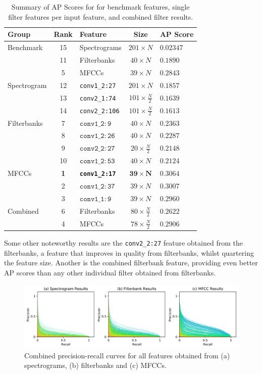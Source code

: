 \begin{table}[!ht]
    \mytable
    \caption{Summary of AP Scores for for benchmark features, single filter features per input feature, and combined filter results.}
    \begin{tabularx}{0.91\linewidth}{@{}lcLcl@{}}
        \toprule
        Group       & Rank    & Feature       & Size  & AP Score   \\ \midrule
        Benchmark   & 15 & Spectrograms  & $201 \times N$  & $0.02347$ \\
                    & 11 & Filterbanks   & $40 \times N$  & $0.1890$ \\
                    & 5 & MFCCs         & $39 \times N$  & $0.2843$ \\ \hline
        Spectrogram & 12 & \texttt{conv1\_2:27} & $201 \times N$  & $0.1857$ \\
                    & 13 & \texttt{conv2\_1:74} & $101 \times \frac{N}{2}$  & $0.1639$ \\
                    & 14 & \texttt{conv2\_2:106} & $101 \times \frac{N}{2}$ & $0.1613$ \\ \hline
        Filterbanks & 7 & $\mathtt{conv1\_2:9}$  & $40 \times N$  & $0.2363$ \\
                    & 8 & $\mathtt{conv1\_2:26}$  & $40 \times N$  & $0.2287$ \\
                    & 9 & $\mathtt{conv2\_2:27}$  & $20 \times \frac{N}{2}$  & $0.2148$ \\
                    & 10 & $\mathtt{conv1\_2:53}$  & $40 \times N$  & $0.2124$ \\ \hline
        MFCCs       & \textbf{1} & \texttt{\textbf{conv1\_2:17}}  & $\bm{39 \times N}$  & $\bm{0.3064}$ \\
                    & 2 & $\mathtt{conv1\_2:37}$  & $39 \times N$  & $0.3007$ \\
                    & 3 & $\mathtt{conv1\_1:9}$  & $39 \times N$  & $0.2960$ \\ \hline
        Combined    & 6 & Filterbanks   & $80 \times \frac{N}{2}$  & $0.2622$ \\
                    & 4 & MFCCs         & $78 \times \frac{N}{2}$  & $0.2906$ \\
        \bottomrule
    \end{tabularx}
    \label{tbl:summarised_results}
\end{table}

Some other noteworthy results are the \texttt{conv2\_2:27} feature obtained from the filterbanks, a feature that improves in quality from filterbanks, whilst quartering the feature size.
Another is the combined filterbank feature, providing even better AP scores than any other individual filter obtained from filterbanks.

\begin{figure}[!h]
    \centering
    \includegraphics[width=0.95\linewidth]{content/fig/pr_all.png}
    \caption{Combined precision-recall curves for all features obtained from (a) spectrograms, (b) filterbanks and (c) MFCCs.}
    \label{fig:pr_curves}
\end{figure}
